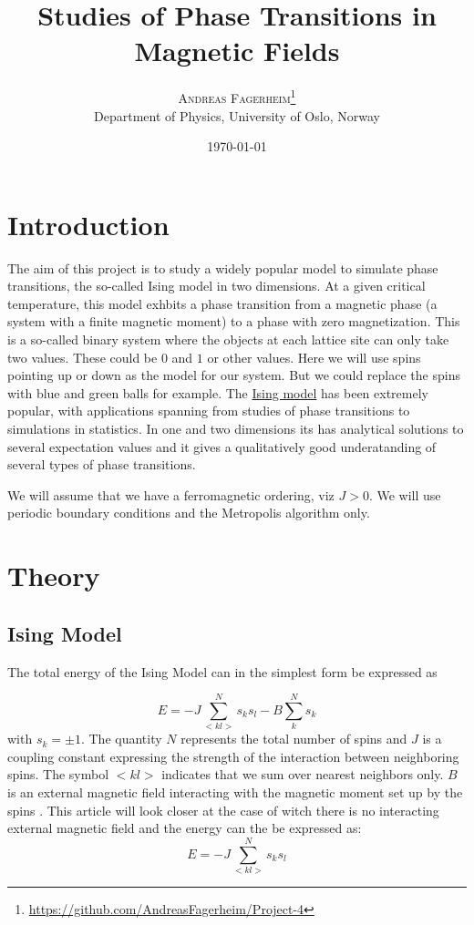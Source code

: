 \documentclass[twoside,twocolumn]{article}
\title{Studies of Phase Transitions in Magnetic Fields } %
\author{%
\textsc{Andreas Fagerheim}\thanks{\url{https://github.com/AndreasFagerheim/Project-4}} \\[1ex] %
\normalsize Department of Physics, University of Oslo, Norway \\ %
}
\date{\today} %
\begin{document}
\maketitle

\section{Introduction}

The aim of this project is to study a widely popular model to simulate phase transitions, the so-called Ising model in two dimensions. At a given critical temperature, this model exhbits a phase transition from a magnetic phase (a system with a finite magnetic moment) to a phase with zero magnetization.
This is a so-called binary system where the objects at each lattice site can only take two values. These could be $0$ and $1$ or other values. Here we will use spins pointing up or down as the model for our system. But we could replace the spins with blue and green balls for example.
The \href{{https://en.wikipedia.org/wiki/Ising_model}}{Ising model} has been extremely popular, with applications spanning from studies of phase transitions to simulations in statistics. In one and two dimensions its has analytical solutions to several expectation values and it gives a qualitatively  good underatanding of several types of phase transitions.  


 We will assume that we have a ferromagnetic
ordering, viz $J> 0$.  We will use periodic boundary conditions and
the Metropolis algorithm only.

\section{Theory}


\subsection{ Ising Model }
The total energy of the Ising Model can in the simplest form be expressed as

\[
E=-J\sum_{< kl >}^{N}s_ks_l - B \sum_{ k }^{N}s_k
\]
with
$s_k=\pm 1$. The quantity $N$ represents the total number of spins and $J$ is a coupling
constant expressing the strength of the interaction between
neighboring spins.  The symbol $<kl>$ indicates that we sum over
nearest neighbors only. $B$ is an external magnetic field interacting with the magnetic moment set up by the spins \cite{Hjorth-Jensen:2015dg}. This article will look closer at the case of witch there is no interacting external magnetic field and the energy can the be expressed as:
\begin{equation}
E=-J\sum_{< kl >}^{N}s_ks_l
\end{equation}
\end{document}
